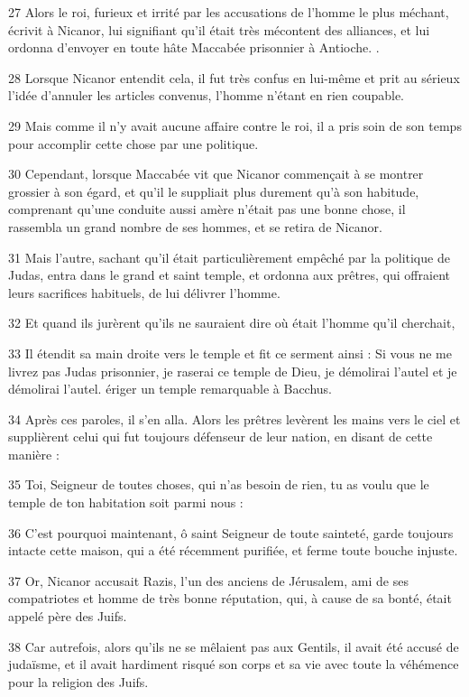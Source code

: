 \par 27 Alors le roi, furieux et irrité par les accusations de l'homme le plus méchant, écrivit à Nicanor, lui signifiant qu'il était très mécontent des alliances, et lui ordonna d'envoyer en toute hâte Maccabée prisonnier à Antioche. .
\par 28 Lorsque Nicanor entendit cela, il fut très confus en lui-même et prit au sérieux l'idée d'annuler les articles convenus, l'homme n'étant en rien coupable.
\par 29 Mais comme il n'y avait aucune affaire contre le roi, il a pris soin de son temps pour accomplir cette chose par une politique.
\par 30 Cependant, lorsque Maccabée vit que Nicanor commençait à se montrer grossier à son égard, et qu'il le suppliait plus durement qu'à son habitude, comprenant qu'une conduite aussi amère n'était pas une bonne chose, il rassembla un grand nombre de ses hommes, et se retira de Nicanor.
\par 31 Mais l'autre, sachant qu'il était particulièrement empêché par la politique de Judas, entra dans le grand et saint temple, et ordonna aux prêtres, qui offraient leurs sacrifices habituels, de lui délivrer l'homme.
\par 32 Et quand ils jurèrent qu'ils ne sauraient dire où était l'homme qu'il cherchait,
\par 33 Il étendit sa main droite vers le temple et fit ce serment ainsi : Si vous ne me livrez pas Judas prisonnier, je raserai ce temple de Dieu, je démolirai l'autel et je démolirai l'autel. ériger un temple remarquable à Bacchus.
\par 34 Après ces paroles, il s'en alla. Alors les prêtres levèrent les mains vers le ciel et supplièrent celui qui fut toujours défenseur de leur nation, en disant de cette manière :
\par 35 Toi, Seigneur de toutes choses, qui n'as besoin de rien, tu as voulu que le temple de ton habitation soit parmi nous :
\par 36 C'est pourquoi maintenant, ô saint Seigneur de toute sainteté, garde toujours intacte cette maison, qui a été récemment purifiée, et ferme toute bouche injuste.
\par 37 Or, Nicanor accusait Razis, l'un des anciens de Jérusalem, ami de ses compatriotes et homme de très bonne réputation, qui, à cause de sa bonté, était appelé père des Juifs.
\par 38 Car autrefois, alors qu'ils ne se mêlaient pas aux Gentils, il avait été accusé de judaïsme, et il avait hardiment risqué son corps et sa vie avec toute la véhémence pour la religion des Juifs.
